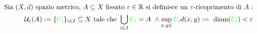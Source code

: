 \documentclass[preview]{standalone}
\begin{document}
\begin{align*}
\text{Sia } (X, d) \text{ spazio metrico, } A \subseteq X \text{ fissato } \varepsilon \in \mathbb{R} \text{ si definisce un } \varepsilon\text{-ricoprimento di } A: \\ \mathcal{U}_{\varepsilon}(A) :=  \{ \textcolor{green}{U_i} \}_{i \in I} \subseteq X \text{ tale che } \bigcup_{i \in I}  \textcolor{green}{U_i}  = A  \ \land \sup_{x,y \in } \textcolor{green}{U_i}  d(x,y) := \text{ diam}( \textcolor{green}{U_i} ) < \varepsilon
\end{align*}
\end{document}
